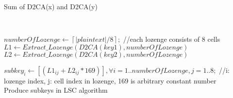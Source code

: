 \documentclass[11pt]{article}
\begin{document}
\begin{algorithm} [H]
{{			
			
			
			
		}	
		
	}

	\caption{Sum of D2CA(x) and D2CA(y)}\label{Code Geneator Procedure} \end{algorithm}\DecMargin{1em}\



\IncMargin{1em} \begin{algorithm} [H]\label{111}
	 
	
	$numberOfLozenge\leftarrow  \left \lceil |plaintext|/8\right \rceil$;\ //each lozenge consists of 8 cells\\
	$L1\leftarrow Extract\_Lozenge(D2CA(key1),numberOfLozenge)$\;
	$L2\leftarrow Extract\_Lozenge(D2CA(key2),numberOfLozenge)$\;
	
	$subkey_i\leftarrow [(L1_{ij}+L2_{ij}*169)], \forall i=1..numberOfLozenge,j=1..8$;\ //i: lozenge index, j: cell index in lozenge, 169 is arbitrary constant number\\
	
	
	\caption{Produce subkeys in LSC algorithm}\label{Code Geneator Procedure} \end{algorithm}\DecMargin{1em}\
\end{document}
